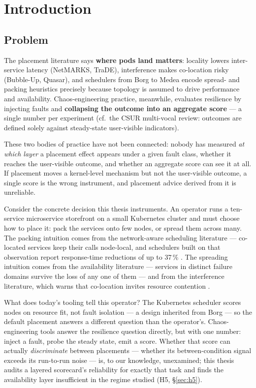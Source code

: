\chapter{Introduction}\label{ch:intro}

\section{Problem}\label{sec:problem}

The placement literature says \textbf{where pods land matters}: locality lowers
inter-service latency (NetMARKS, TraDE), interference makes co-location risky
(Bubble-Up, Quasar), and schedulers from Borg to Medea encode spread- and
packing heuristics precisely because topology is assumed to drive performance
and availability. Chaos-engineering practice, meanwhile, evaluates resilience
by injecting faults and \textbf{collapsing the outcome into an aggregate score}
--- a single number per experiment (cf.\ the CSUR multi-vocal review: outcomes
are defined solely against steady-state user-visible indicators).

These two bodies of practice have not been connected: nobody has measured \emph{at
which layer} a placement effect appears under a given fault class, whether it
reaches the user-visible outcome, and whether an aggregate score can see it at
all. If placement moves a kernel-level mechanism but not the user-visible
outcome, a single score is the wrong instrument, and placement advice derived
from it is unreliable.

Consider the concrete decision this thesis instruments. An operator runs a
ten-service microservice storefront on a small Kubernetes cluster and must
choose how to place it: pack the services onto few nodes, or spread them across
many. The packing intuition comes from the network-aware scheduling literature
--- co-located services keep their calls node-local, and schedulers built on
that observation report response-time reductions of up to 37\,\%
\citep{wojciechowski2021netmarks}. The spreading intuition comes from the
availability literature --- services in distinct failure domains survive the
loss of any one of them \citep{garefalakis2018medea} --- and from the
interference literature, which warns that co-location invites resource
contention \citep{mars2011bubbleup,delimitrou2014quasar}.

What does today's tooling tell this operator? The Kubernetes scheduler scores
nodes on resource fit, not fault isolation --- a design inherited from Borg
\citep{verma2015borg,burns2016borg} --- so the default placement answers a
different question than the operator's. Chaos-engineering tools answer the
resilience question directly, but with one number: inject a fault, probe the
steady state, emit a score. Whether that score can actually \emph{discriminate}
between placements --- whether its between-condition signal exceeds its
run-to-run noise --- is, to our knowledge, unexamined; this thesis audits a
layered scorecard's reliability for exactly that task and finds the availability
layer insufficient in the regime studied (H5, \S\ref{sec:h5}).

